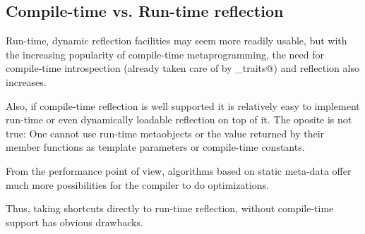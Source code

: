 \subsection{Compile-time vs. Run-time reflection}

Run-time, dynamic reflection facilities may seem more readily
usable, but with the increasing popularity of compile-time metaprogramming,
the need for compile-time introspection (already taken care of
by \verb@type_traits@) and reflection also increases.

Also, if compile-time reflection is well supported it is relatively
easy to implement run-time or even dynamically loadable reflection
on top of it. The oposite is not true: One cannot use run-time metaobjects
or the value returned by their member functions as template parameters
or compile-time constants.

From the performance point of view, algorithms based on static
meta-data offer much more possibilities for the compiler to do
optimizations.

Thus, taking shortcuts directly to run-time reflection, without
compile-time support has obvious drawbacks.

